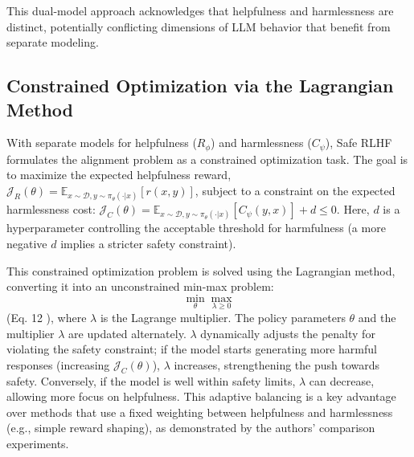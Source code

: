 \documentclass{article} %
\begin{document}

This dual-model approach acknowledges that helpfulness and harmlessness are distinct, potentially conflicting dimensions of LLM behavior that benefit from separate modeling.

\subsection{Constrained Optimization via the Lagrangian Method}
With separate models for helpfulness ($R_\phi$) and harmlessness ($C_\psi$), Safe RLHF formulates the alignment problem as a constrained optimization task. \cite{Dai2023SafeRLHF} The goal is to maximize the expected helpfulness reward, $\mathcal{J}_R(\theta) = \mathbb{E}_{x \sim \mathcal{D}, y \sim \pi_\theta(\cdot|x)}[r(x,y)]$, subject to a constraint on the expected harmlessness cost: $\mathcal{J}_C(\theta) = \mathbb{E}_{x \sim \mathcal{D}, y \sim \pi_\theta(\cdot|x)}[C_\psi(y,x)] + d \le 0$. Here, $d$ is a hyperparameter controlling the acceptable threshold for harmfulness (a more negative $d$ implies a stricter safety constraint).

This constrained optimization problem is solved using the Lagrangian method, converting it into an unconstrained min-max problem:
$$ \min_{\theta} \max_{\lambda \ge 0} $$
(Eq. 12 \cite{Dai2023SafeRLHF}), where $\lambda$ is the Lagrange multiplier. The policy parameters $\theta$ and the multiplier $\lambda$ are updated alternately. $\lambda$ dynamically adjusts the penalty for violating the safety constraint; if the model starts generating more harmful responses (increasing $\mathcal{J}_C(\theta)$), $\lambda$ increases, strengthening the push towards safety. Conversely, if the model is well within safety limits, $\lambda$ can decrease, allowing more focus on helpfulness. This adaptive balancing is a key advantage over methods that use a fixed weighting between helpfulness and harmlessness (e.g., simple reward shaping), as demonstrated by the authors' comparison experiments. \cite{Dai2023SafeRLHF}
\end{document}
